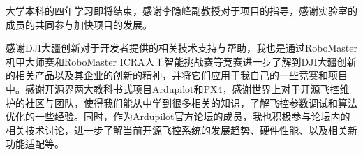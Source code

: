 \begin{thanksfor}
大学本科的四年学习即将结束，感谢李隐峰副教授对于项目的指导，感谢实验室的成员的共同参与加快项目的发展。

感谢DJI大疆创新对于开发者提供的相关技术支持与帮助，我也是通过RoboMaster机甲大师赛和RoboMaster ICRA人工智能挑战赛等竞赛进一步了解到DJI大疆创新的相关产品以及其企业的创新的精神，并将它们应用于我自己的一些竞赛和项目中。感谢开源界两大教科书式项目Ardupilot和PX4，感谢世界上对于开源飞控维护的社区与团队，使得我们能从中学到很多相关的知识，了解飞控参数调试和算法优化的一些经验。同时，作为Ardupilot官方论坛的成员，我也积极参与论坛内的相关技术讨论，进一步了解当前开源飞控系统的发展趋势、硬件性能、以及相关新功能适配等。

\end{thanksfor}